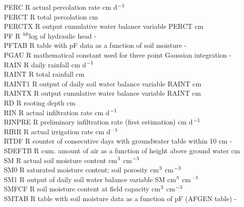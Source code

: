 \begin{tabbing}
PERC\> \> R\> actual percolation rate\> \> \> \> \> \> \> cm d$^{{\rm -1}}$\\
PERCT\> \> R\> total percolation\> \> \> \> \> \> \> cm\\
PERCTX\> \> R\> output cumulative water balance variable PERCT\> \> \> \> \> \> \> cm\\
PF\> \> R\> $^{{\rm 10}}$log of hydraulic head\> \> \> \> \> \> \> -\\
PFTAB\> \> R\> table with pF data as a function of soil moisture\> \> \> \> \> \> \> -\\
PGAU\> \> R\> mathematical constant used for three point Gaussian integration\> \> \> \> \> \> \> -\\
RAIN\> \> R\> daily rainfall\> \> \> \> \> \> \> cm d$^{{\rm -1}}$\\
RAINT\> \> R\> total rainfall\> \> \> \> \> \> \> cm\\
RAINT1\> \> R\> output of daily soil water balance variable RAINT\> \> \> \> \> \> \> cm\\
RAINTX\> \> R\> output cumulative water balance variable RAINT\> \> \> \> \> \> \> cm\\
RD\> \> R\> rooting depth\> \> \> \> \> \> \> cm\\
RIN\> \> R\> actual infiltration rate\> \> \> \> \> \> \> cm d$^{{\rm -1}}$\\
RINPRE\> \> R\> preliminary infiltration rate (first estimation)\> \> \> \> \> \> \> cm d$^{{\rm -1}}$\\
RIRR\> \> R\> actual irrigation rate\> \> \> \> \> \> \> cm d$^{{\rm -1}}$\\
RTDF\> \> R\> counter of consecutive days with groundwater table within 10 cm\> \> \> \> \> \> \> -\\
SDEFTB\> \> R\> cum. amount of air as a function of height above ground water\> \> \> \> \> \> \> cm \\
SM\> \> R\> actual soil moisture content\> \> \> \> \> \> \> cm$^{{\rm 3}}$ cm$^{{\rm -3}}$\\
SM0\> \> R\> saturated moisture content; soil porosity\> \> \> \> \> \> \> cm$^{{\rm 3}}$ cm$^{{\rm -3}}$\\
SM1\> \> R\> output of daily soil water balance variable SM\> \> \> \> \> \> \> cm$^{{\rm 3}}$ cm$^{{\rm -3}}$\\
SMFCF\> \> R\> soil moisture content at field capacity\> \> \> \> \> \> \> cm$^{{\rm 3}}$ cm$^{{\rm -3}}$\\
SMTAB\> \> R\> table with soil moisture data as a function of pF (AFGEN table)\> \> \> \> \> \> \> -\\

\end{tabbing}
